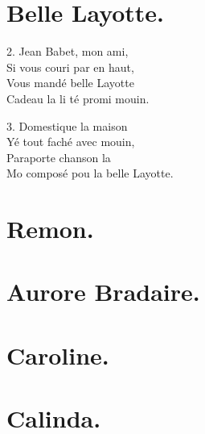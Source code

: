 \documentclass[a5paper,10pt]{book}
\begin{document}
\newpage
\section{Belle Layotte.}
\thispagestyle{empty}

\begin{song}
\end{song}

\begin{stanza}
\item[2.]
  Jean Babet, mon ami,\\ 
  Si vous couri par en haut,\\
  Vous mand\'e belle Layotte\\
  Cadeau la li t\'e promi mouin.
\item[3.]
  Domestique la maison\\
  Y\'e tout fach\'e avec mouin,\\
  Paraporte chanson la\\
  Mo compos\'e pou la belle Layotte.
\end{stanza}


\newpage
\section{Remon.}
\thispagestyle{empty}

\begin{song}
\end{song}


\newpage
\section{Aurore Bradaire.}
\thispagestyle{empty}

\begin{song}
\end{song}


\newpage
\section{Caroline.}
\thispagestyle{empty}

\begin{song}
\end{song}


\newpage
\section{Calinda.}
\thispagestyle{empty}
\end{document}
